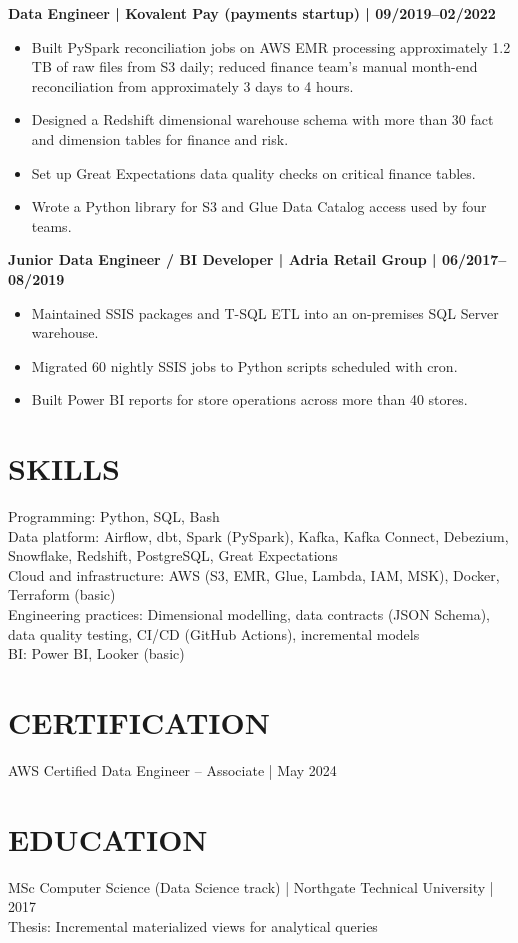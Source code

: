 \documentclass[11pt,a4paper]{article}
\begin{document}
\textbf{Data Engineer | Kovalent Pay (payments startup) | 09/2019--02/2022}
\begin{itemize}
\item Built PySpark reconciliation jobs on AWS EMR processing approximately 1.2 TB of raw files from S3 daily; reduced finance team's manual month-end reconciliation from approximately 3 days to 4 hours.
\item Designed a Redshift dimensional warehouse schema with more than 30 fact and dimension tables for finance and risk.
\item Set up Great Expectations data quality checks on critical finance tables.
\item Wrote a Python library for S3 and Glue Data Catalog access used by four teams.
\end{itemize}

\textbf{Junior Data Engineer / BI Developer | Adria Retail Group | 06/2017--08/2019}
\begin{itemize}
\item Maintained SSIS packages and T-SQL ETL into an on-premises SQL Server warehouse.
\item Migrated 60 nightly SSIS jobs to Python scripts scheduled with cron.
\item Built Power BI reports for store operations across more than 40 stores.
\end{itemize}

\section*{SKILLS}
Programming: Python, SQL, Bash\\
Data platform: Airflow, dbt, Spark (PySpark), Kafka, Kafka Connect, Debezium, Snowflake, Redshift, PostgreSQL, Great Expectations\\
Cloud and infrastructure: AWS (S3, EMR, Glue, Lambda, IAM, MSK), Docker, Terraform (basic)\\
Engineering practices: Dimensional modelling, data contracts (JSON Schema), data quality testing, CI/CD (GitHub Actions), incremental models\\
BI: Power BI, Looker (basic)

\section*{CERTIFICATION}
AWS Certified Data Engineer -- Associate | May 2024

\section*{EDUCATION}
MSc Computer Science (Data Science track) | Northgate Technical University | 2017\\
Thesis: Incremental materialized views for analytical queries
\end{document}
